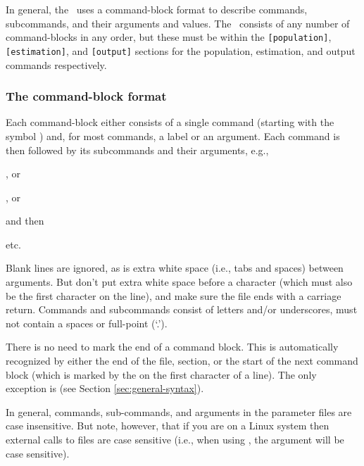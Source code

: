 In general, the \config\ uses a command-block format to describe commands, subcommands, and their arguments and values. The \config\ consists of any number of command-blocks in any order, but these must be within the \texttt{[population]}, \texttt{[estimation]}, and  \texttt{[output]} sections for the population, estimation, and output commands respectively. 

\subsubsection{The command-block format}

Each command-block either consists of a single command (starting with the symbol \@) and, for most commands, a label or an argument. Each command is then followed by its subcommands and their arguments, e.g., 

\begin{description}
\item {}, or 
\item {} , or
\item {} 
\end{description}

and then
\begin{description}
\item {} 
\item {} 
\item etc.
\end{description}

Blank lines are ignored, as is extra white space (i.e., tabs and spaces) between arguments. But don't put extra white space before a \command{} character (which must also be the first character on the line), and make sure the file ends with a carriage return. Commands and subcommands consist of letters and/or underscores, must not contain a spaces or full-point (`.').

There is no need to mark the end of a command block. This is automatically recognized by either the end of the file, section, or the start of the next command block (which is marked by the \command{} on the first character of a line). The only exception is  (see Section \ref{sec:general-syntax}). 

In general, commands, sub-commands, and arguments in the parameter files are case insensitive. But note, however, that if you are on a Linux system then external calls to files are case sensitive (i.e., when using  , the argument  will be case sensitive). 

